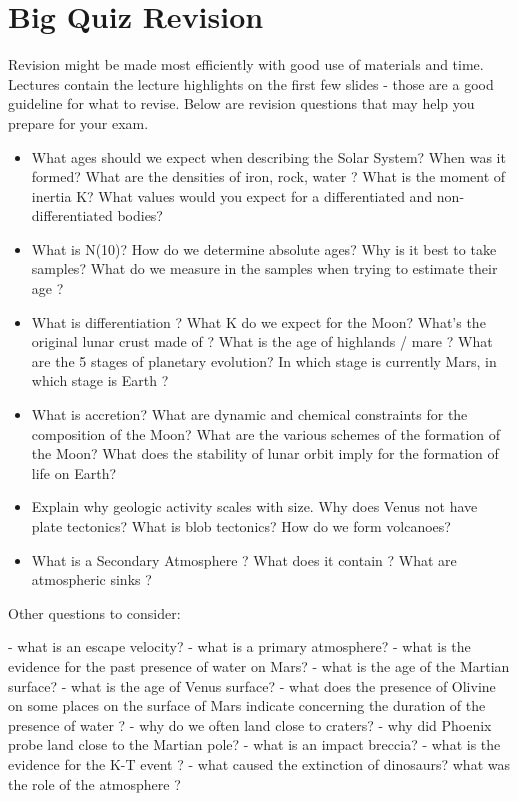 \documentclass[paper=a4, fontsize=11pt]{scrartcl} %
\numberwithin{equation}{section} %
\begin{document}

\section{Big Quiz  Revision  }

Revision might be made most efficiently with good use of materials and time. Lectures contain the lecture highlights on the first few slides - those are a good guideline for what to revise.  Below are revision questions that may help you prepare for your exam.

\begin{itemize}
\item What ages should we expect when describing the Solar System? When was it formed? What are the densities of iron, rock, water ? What is the moment of inertia K? What values would you expect for a differentiated and non-differentiated bodies? 
\item What is N(10)?   How do we determine absolute ages? Why is it best to take samples? What do we measure in the samples when trying to estimate their age ? 
\item What is differentiation ?  What K do we expect for the Moon?  What's the original lunar crust made of ? What is the age of highlands  / mare ? What are the 5 stages of planetary evolution? In which stage is currently Mars, in which stage is Earth ?  
\item  What is accretion? What are dynamic and chemical constraints for the composition of the Moon? What are the various schemes of the formation of the Moon? What does the stability of lunar orbit imply for the formation of life on Earth?  
\item Explain why geologic activity scales with size. Why does Venus not have plate tectonics? What is blob tectonics? How do we form volcanoes? 

\item What is a Secondary Atmosphere ? What does it contain ? What are atmospheric sinks ? 

\end{itemize}

Other questions to consider:

- what is an escape velocity?  
- what is a primary  atmosphere? 
- what is the evidence for the past presence of water on Mars? 
- what is the age of the Martian surface?
- what is the age of Venus surface? 
- what does the presence of Olivine on some places on the surface of Mars indicate concerning the duration of the presence of water ?  
- why do we often  land close to craters?
- why did Phoenix probe land close to the Martian pole? 
- what is an impact breccia?
- what is the evidence for the K-T event ? 
- what caused the extinction of dinosaurs? what was the role of the atmosphere ? 
\end{document}
